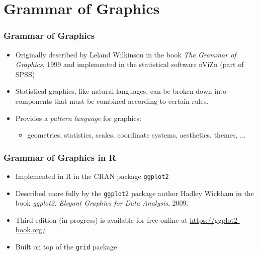 \documentclass[xcolor=svgnames]{beamer}
\newcommand{\code}[1]{\texttt{#1}}
\begin{document}
\section{Grammar of Graphics}

\begin{frame}
  \frametitle{Grammar of Graphics}

  \begin{itemize}
  \item Originally described by Leland Wilkinson in the book {\em The
    Grammar of Graphics}, 1999 and implemented in the statistical
    software nViZn (part of SPSS)
  \item Statistical graphics, like natural languages, can be broken down
   into components that must be combined according to certain rules.
  \item Provides a {\em pattern language} for graphics:
     \begin{itemize}
     \item geometries, statistics, scales, coordinate systems,
          aesthetics, themes, ...
     \end{itemize}
   \end{itemize}
\end{frame}

\begin{frame}
   \frametitle{Grammar of Graphics in R}

   \begin{itemize}
   \item Implemented in R in the CRAN package \code{ggplot2}
   \item Described more fully by the \code{ggplot2} package author Hadley
      Wickham in the book {\em ggplot2: Elegant Graphics for Data Analysis},
      2009.
   \item Third edition (in progress) is available for free online at
      \url{https://ggplot2-book.org/}
   \item Built on top of the \texttt{grid} package
   \end{itemize}

\end{frame}
\end{document}
